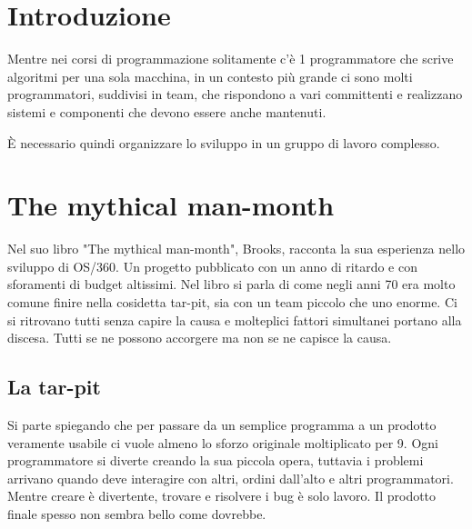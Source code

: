 \documentclass[a4paper,12pt,titlepage,oneside]{book}
\begin{document}
\tableofcontents
\chapter{Introduzione}
Mentre nei corsi di programmazione solitamente c'è 1 programmatore che scrive algoritmi per una sola macchina, in un contesto più grande ci sono molti programmatori, suddivisi in team, che rispondono a vari committenti e realizzano sistemi e componenti che devono essere anche mantenuti.

È necessario quindi organizzare lo sviluppo in un gruppo di lavoro complesso.

\chapter{The mythical man-month}
Nel suo libro "The mythical man-month", Brooks, racconta la sua esperienza nello sviluppo di OS/360. Un progetto pubblicato con un anno di ritardo e con sforamenti di budget altissimi.
Nel libro si parla di come negli anni 70 era molto comune finire nella cosidetta tar-pit, sia con un team piccolo che uno enorme. Ci si ritrovano tutti senza capire la causa e molteplici fattori simultanei portano alla discesa. Tutti se ne possono accorgere ma non se ne capisce la causa.

\section{La tar-pit}
Si parte spiegando che per passare da un semplice programma a un prodotto veramente usabile ci vuole almeno lo sforzo originale moltiplicato per 9.
Ogni programmatore si diverte creando la sua piccola opera, tuttavia i problemi arrivano quando deve interagire con altri, ordini dall'alto e altri programmatori. Mentre creare è divertente, trovare e risolvere i bug è solo lavoro. Il prodotto finale spesso non sembra bello come dovrebbe.
\end{document}
